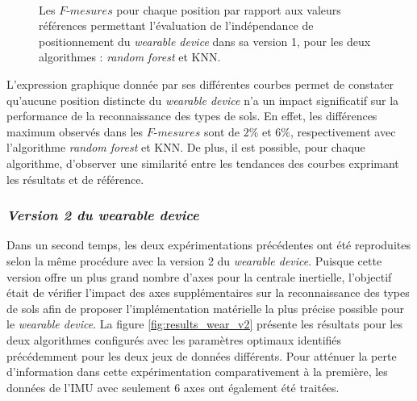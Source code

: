 \begin{figure}[t!]
    \centering
    \\[20pt]
    \caption{Les $F\mbox{-} mesures$ pour chaque position par rapport aux valeurs références permettant l'évaluation de l'indépendance de positionnement du \textit{wearable device} dans sa version 1, pour les deux algorithmes : \textit{random forest} et \acs{KNN}.}
    \label{fig:pos_ind_wear_v1}
\end{figure}


L'expression graphique donnée par ses différentes courbes permet de constater qu'aucune position distincte du \textit{wearable device} n'a un impact significatif sur la performance de la reconnaissance des types de sols. En effet, les différences maximum observés dans les $F\mbox{-}mesures$ sont de $2\%$ et $6\%$, respectivement avec l'algorithme \textit{random forest} et \acs{KNN}. De plus, il est possible, pour chaque algorithme, d'observer une similarité entre les tendances des courbes exprimant les résultats et de référence.

\subsubsection{\textit{Version 2 du wearable device}}

Dans un second temps, les deux expérimentations précédentes ont été reproduites selon la même procédure avec la version 2 du \textit{wearable device}. Puisque cette version offre un plus grand nombre d'axes pour la centrale inertielle, l'objectif était de vérifier l'impact des axes supplémentaires sur la reconnaissance des types de sols afin de proposer l'implémentation matérielle la plus précise possible pour le \textit{wearable device}. La figure \ref{fig:results_wear_v2} présente les résultats pour les deux algorithmes configurés avec les paramètres optimaux identifiés précédemment pour les deux jeux de données différents. Pour atténuer la perte d'information dans cette expérimentation comparativement à la première, les données de l'\acs{IMU} avec seulement 6 axes ont également été traitées.

